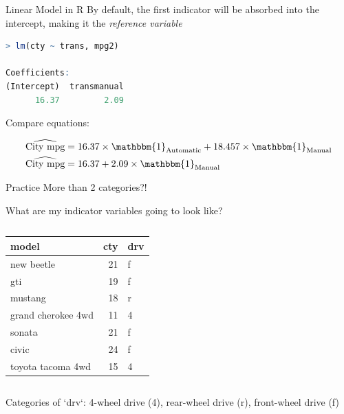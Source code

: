 \documentclass{beamer}
\begin{document}
\begin{frame}[fragile]{Linear Model in R}
\small
By default, the first indicator will be absorbed into the intercept, making it the \textit{reference variable}
\begin{lstlisting}[language=R]
> lm(cty ~ trans, mpg2)

Coefficients:
(Intercept)  transmanual  
      16.37         2.09  
\end{lstlisting}

Compare equations:

\begin{align*}
\widehat{\text{City mpg}} &= 16.37 \times \mathbbm{1}_{\text{Automatic}} + 18.457 \times \mathbbm{1}_{\text{Manual}} \\
\widehat{\text{City mpg}} &= 16.37 + 2.09 \times \mathbbm{1}_{\text{Manual}}
\end{align*}
\end{frame}


\begin{frame}{Practice}
\scriptsize
More than 2 categories?!

What are my indicator variables going to look like?

\begin{columns}
\begin{column}{0.45\textwidth}
\vspace{3mm}
\begin{table}[ht]
\centering
\begin{tabular}{lrl}
  \hline
model & cty & drv \\ 
  \hline
new beetle &  21 & f \\ 
  gti &  19 & f \\ 
  mustang &  18 & r \\ 
  grand cherokee 4wd &  11 & 4 \\ 
  sonata &  21 & f \\ 
  civic &  24 & f \\ 
  toyota tacoma 4wd &  15 & 4 \\ 
   \hline
\end{tabular}
\end{table}
\end{column}
\begin{column}{0.45\textwidth}  %

\end{column}
\end{columns}

Categories of `drv`: 4-wheel drive (4), rear-wheel drive (r), front-wheel drive (f)
\end{frame}
\end{document}
